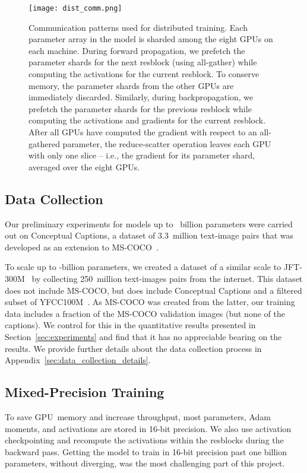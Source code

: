 \documentclass{article}
\begin{document}
\begin{figure}[t]
    \centering
    \texttt{[image: dist\_comm.png]}
    \caption{Communication patterns used for distributed training. Each parameter array in the model is sharded among the eight GPUs on each machine. During forward propagation, we prefetch the parameter shards for the next resblock (using all-gather) while computing the activations for the current resblock. To conserve memory, the parameter shards from the other GPUs are immediately discarded. Similarly, during backpropagation, we prefetch the parameter shards for the previous resblock while computing the activations and gradients for the current resblock. After all GPUs have computed the gradient with respect to an all-gathered parameter, the reduce-scatter operation leaves each GPU with only one slice -- i.e., the gradient for its parameter shard, averaged over the eight GPUs.}
    \label{fig:dist_comm}
\end{figure}

\subsection{Data Collection}
\label{sec:data_collection}

Our preliminary experiments for models up to ~billion parameters were carried out on Conceptual Captions, a dataset of 3.3~million text-image pairs that was developed as an extension to MS-COCO~\cite{lin2014microsoft}. 

To scale up to -billion parameters, we created a dataset of a similar scale to JFT-300M~\cite{sun2017revisiting} by collecting 250~million text-images pairs from the internet. This dataset does not include MS-COCO, but does include Conceptual Captions and a filtered subset of YFCC100M~\cite{thomee2016yfcc100m}. As MS-COCO was created from the latter, our training data includes a fraction of the MS-COCO validation images (but none of the captions). We control for this in the quantitative results presented in Section~\ref{sec:experiments} and find that it has no appreciable bearing on the results. We provide further details about the data collection process in Appendix~\ref{sec:data_collection_details}.

\subsection{Mixed-Precision Training}
\label{sec:mp_train}

To save GPU~memory and increase throughput, most parameters, Adam moments, and activations are stored in 16-bit precision. We also use activation checkpointing and recompute the activations within the resblocks during the backward pass. Getting the model to train in 16-bit precision past one billion parameters, without diverging, was the most challenging part of this project.
\end{document}
